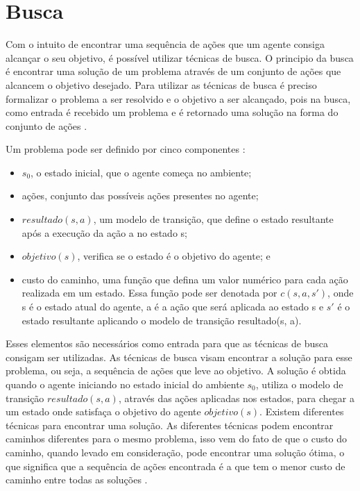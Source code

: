 \chapter{\label{chap:busca}Busca}

Com o intuito de encontrar uma sequência de ações que um agente consiga alcançar o seu objetivo, é possível utilizar técnicas de busca.
O principio da busca é encontrar uma solução de um problema através de um conjunto de ações que alcancem o objetivo desejado. 
Para utilizar as técnicas de busca é preciso formalizar o problema a ser resolvido e o objetivo a ser alcançado, pois na busca, como entrada é recebido um problema e é retornado uma solução na forma do conjunto de ações \cite{intelligence2003modern}. 

Um problema pode ser definido por cinco componentes \cite{intelligence2003modern}: 

\begin{itemize}
	\item $s_{0}$, o estado inicial, que o agente começa no ambiente;
	\item ações, conjunto das possíveis ações presentes no agente;
	\item $resultado(s, a)$, um modelo de transição, que define o estado resultante após a execução da ação a no estado s;
	\item $objetivo(s)$, verifica se o estado é o objetivo do agente; e
	\item custo do caminho, uma função que defina um valor numérico para cada ação realizada em um estado. Essa função pode ser denotada por $c(s, a, s')$, onde s é o estado atual do agente, a é a ação que será aplicada ao estado s e $s'$ é o estado resultante aplicando o modelo de transição resultado(s, a). 
\end{itemize}   


Esses elementos são necessários como entrada para que as técnicas de busca consigam ser utilizadas. As técnicas de busca visam encontrar a solução para esse problema, ou seja, a sequência de ações que leve ao objetivo. 
A solução é obtida quando o agente iniciando no estado inicial do ambiente $s_{0}$, utiliza o modelo de transição $resultado(s, a)$, através das ações aplicadas nos estados, para chegar a um estado onde satisfaça o objetivo do agente $objetivo(s)$.
Existem diferentes técnicas para encontrar uma solução. As diferentes técnicas podem encontrar caminhos diferentes para o mesmo problema, isso vem do fato de que o custo do caminho, quando levado em consideração, pode encontrar uma solução ótima, o que significa que a sequência de ações encontrada é a que tem o menor custo de caminho entre todas as soluções \cite{intelligence2003modern}. 

